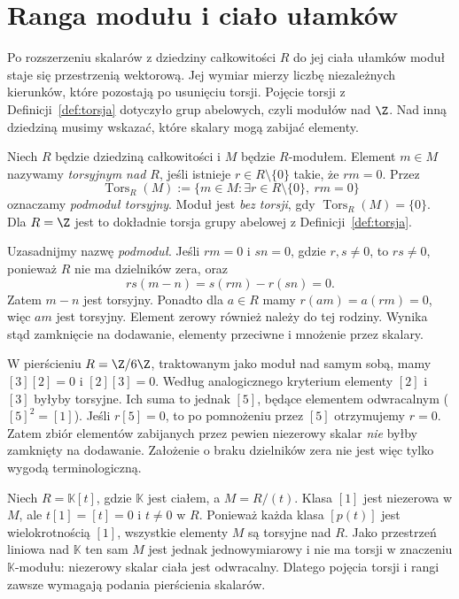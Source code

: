 \section{Ranga modułu i ciało ułamków}
\label{sec:ranga-modulu}

Po rozszerzeniu skalarów z dziedziny całkowitości $R$ do jej
ciała ułamków moduł staje się przestrzenią wektorową. Jej wymiar
mierzy liczbę niezależnych kierunków, które pozostają po usunięciu
torsji. Pojęcie torsji z Definicji~\ref{def:torsja} dotyczyło
grup abelowych, czyli modułów nad $\Z$. Nad inną dziedziną
musimy wskazać, które skalary mogą zabijać elementy.

\begin{definicja}
\label{def:torsja-r-modulu-5}
Niech $R$ będzie dziedziną całkowitości i $M$ będzie
$R$-modułem. Element $m\in M$ nazywamy
\emph{torsyjnym nad $R$}, jeśli istnieje $r\in R\setminus\{0\}$
takie, że $rm=0$. Przez
\[
 \operatorname{Tors}_R(M)
 :=\{m\in M:\exists r\in R\setminus\{0\},\ rm=0\}
\]
oznaczamy \emph{podmoduł torsyjny}. Moduł jest
\emph{bez torsji}, gdy $\operatorname{Tors}_R(M)=\{0\}$.
Dla $R=\Z$ jest to dokładnie torsja grupy abelowej
z Definicji~\ref{def:torsja}.
\end{definicja}

Uzasadnijmy nazwę \emph{podmoduł}. Jeśli $rm=0$ i $sn=0$,
gdzie $r,s\ne0$, to $rs\ne0$, ponieważ $R$ nie ma
dzielników zera, oraz
\[
 rs(m-n)=s(rm)-r(sn)=0.
\]
Zatem $m-n$ jest torsyjny. Ponadto dla $a\in R$
mamy $r(am)=a(rm)=0$, więc $am$ jest torsyjny.
Element zerowy również należy do tej rodziny.
Wynika stąd zamknięcie na dodawanie, elementy przeciwne
i mnożenie przez skalary.

\begin{przyklad}
\label{prz:torsja-z-dzielnikami-zera-5}
W pierścieniu $R=\Z/6\Z$, traktowanym jako
moduł nad samym sobą, mamy $[3][2]=0$
i $[2][3]=0$. Według analogicznego kryterium
elementy $[2]$ i $[3]$ byłyby torsyjne.
Ich suma to jednak $[5]$, będące elementem
odwracalnym ($[5]^2=[1]$). Jeśli
$r[5]=0$, to po pomnożeniu przez $[5]$
otrzymujemy $r=0$. Zatem zbiór elementów
zabijanych przez pewien niezerowy skalar
\emph{nie} byłby zamknięty na dodawanie.
Założenie o braku dzielników zera
nie jest więc tylko wygodą terminologiczną.
\end{przyklad}

\begin{przyklad}
\label{prz:torsja-wielomiany-5}
Niech $R=\mathbb K[t]$, gdzie $\mathbb K$ jest ciałem,
a $M=R/(t)$. Klasa $[1]$ jest niezerowa w $M$,
ale $t[1]=[t]=0$ i $t\ne0$ w $R$.
Ponieważ każda klasa $[p(t)]$ jest wielokrotnością
$[1]$, wszystkie elementy $M$ są torsyjne nad $R$.
Jako przestrzeń liniowa nad $\mathbb K$ ten sam $M$
jest jednak jednowymiarowy i nie ma torsji
w znaczeniu $\mathbb K$-modułu: niezerowy skalar
ciała jest odwracalny.
Dlatego pojęcia torsji i rangi zawsze wymagają
podania pierścienia skalarów.
\end{przyklad}


